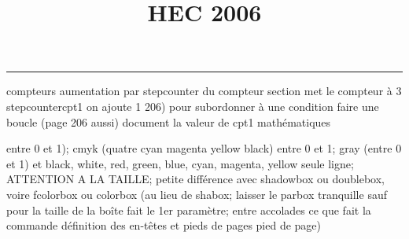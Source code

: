 \documentclass[11pt]{article}%
\title{\bf \vspace{-1cm} HEC 2006} %
\author{} %
\date{} %
\renewcommand{\headrulewidth}{0pt}%
\renewcommand{\footrulewidth}{0.4pt}%
\begin{document}
\maketitle %
\vspace{-1.2cm}\hrule %
\thispagestyle{fancy}

\vspace*{.4cm}


compteurs%
aumentation par stepcounter du compteur section%
met le compteur à 3%
stepcounter{cpt1} on ajoute 1%
206) pour subordonner à une condition %
faire une boucle (page 206 aussi) %
document la valeur de cpt1 
mathématiques\newcommand{\ch}{\operatorname{ch}} 
\newcommand{\sh}{\operatorname{sh}}
\renewcommand{\tanh}{\operatorname{th}}
\renewcommand{\sinh}{\operatorname{sh}}
\renewcommand{\cosh}{\operatorname{ch}}
\newcommand{\argsh}{\operatorname{argsh}}
\newcommand{\argch}{\operatorname{argch}}
\newcommand{\argth}{\operatorname{argth}}
\newcommand{\Id}{\operatorname{Id}}
\renewcommand{\leq}{\leq}
\renewcommand{\geq}{\geq }

\newcommand{\dlim}{\lim}
\newcommand{\dsum}{\sum}
\newcommand{\dprod}{\prod}



entre 0 et 1); cmyk (quatre cyan magenta yellow black) entre 0 et 1;
gray (entre 0 et 1) et black, white, red, green, blue, cyan, magenta,
yellow%
seule ligne; ATTENTION A LA TAILLE; petite différence avec shadowbox ou
doublebox, voire fcolorbox ou colorbox (au lieu de shabox; laisser le
parbox tranquille sauf pour la taille de la boîte
\newcommand{\Tbox}[1]{\begin{center} \shabox{\parbox{0.6
\linewidth}{#1}} \end{center}} %
fait le 1er paramètre; entre accolades ce que fait la commande
définition des en-têtes et pieds de pages\pagestyle{fancy}
\chead{}
\rfoot[ \ \thepage]{\thepage}
\cfoot{}
\lfoot{}
\thispagestyle{fancy} %
pied de page)\renewcommand{\footrulewidth}{0.4pt}
\renewcommand{\headrulewidth}{0.4pt}
\end{document}
